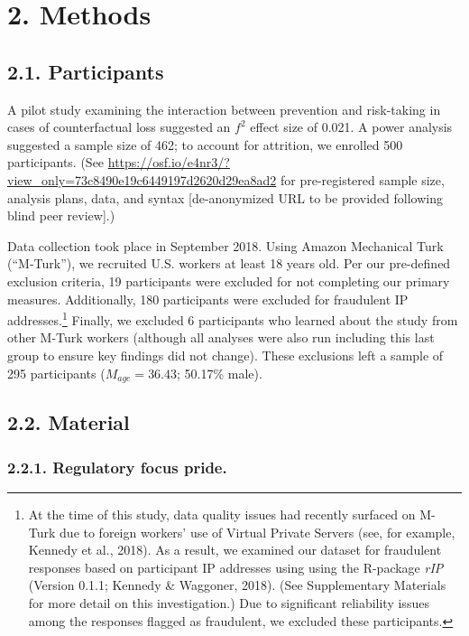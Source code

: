 \documentclass[man,floatsintext]{apa6}
\let\rmarkdownfootnote\footnote%
\def\footnote{\protect\rmarkdownfootnote}
\begin{document}
\hypertarget{methods}{%
\section{2. Methods}\label{methods}}

\hypertarget{participants}{%
\subsection{2.1. Participants}\label{participants}}

A pilot study examining the interaction between prevention and risk-taking in cases of counterfactual loss suggested an \(f^2\) effect size of 0.021. A power analysis suggested a sample size of 462; to account for attrition, we enrolled 500 participants. (See \url{https://osf.io/e4nr3/?view_only=73c8490e19c6449197d2620d29ea8ad2} for pre-registered sample size, analysis plans, data, and syntax {[}de-anonymized URL to be provided following blind peer review{]}.)

Data collection took place in September 2018. Using Amazon Mechanical Turk (\enquote{M-Turk}), we recruited U.S. workers at least 18 years old. Per our pre-defined exclusion criteria, 19 participants were excluded for not completing our primary measures. Additionally, 180 participants were excluded for fraudulent IP addresses.\footnote{At the time of this study, data quality issues had recently surfaced on M-Turk due to foreign workers' use of Virtual Private Servers (see, for example, Kennedy et al., 2018). As a result, we examined our dataset for fraudulent responses based on participant IP addresses using using the R-package \emph{rIP} (Version 0.1.1; Kennedy \& Waggoner, 2018). (See Supplementary Materials for more detail on this investigation.) Due to significant reliability issues among the responses flagged as fraudulent, we excluded these participants.} Finally, we excluded 6 participants who learned about the study from other M-Turk workers (although all analyses were also run including this last group to ensure key findings did not change). These exclusions left a sample of 295 participants (\(M_{age} = 36.43\); 50.17\% male).

\hypertarget{material}{%
\subsection{2.2. Material}\label{material}}

\hypertarget{regulatory-focus-pride.}{%
\subsubsection{2.2.1. Regulatory focus pride.}\label{regulatory-focus-pride.}}
\end{document}

